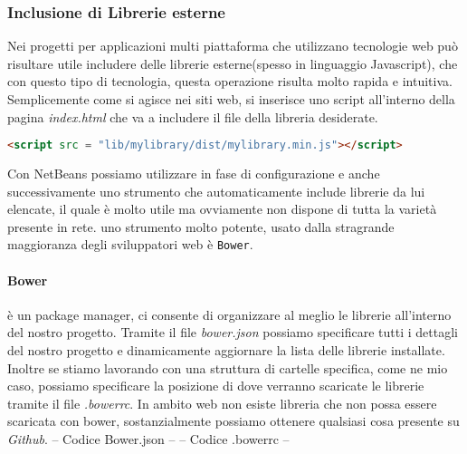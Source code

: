 \subsubsection{Inclusione di Librerie esterne}
Nei progetti per applicazioni multi piattaforma che utilizzano tecnologie web può risultare utile includere delle librerie esterne(spesso in linguaggio Javascript), che con questo tipo di tecnologia, questa operazione risulta molto rapida e intuitiva. \\
Semplicemente come si agisce nei siti web, si inserisce uno script all'interno della pagina \emph{index.html} che va a includere il file della libreria desiderate.
\begin{lstlisting}[language=html]
	<script src = "lib/mylibrary/dist/mylibrary.min.js"></script>
\end{lstlisting}
Con NetBeans possiamo utilizzare in fase di configurazione e anche successivamente uno strumento che automaticamente include librerie da lui elencate, il quale è molto utile ma ovviamente non dispone di tutta la varietà presente in rete. uno strumento molto potente, usato dalla stragrande maggioranza degli sviluppatori web è \texttt{Bower}.
\paragraph{Bower} è un package manager, ci consente di organizzare al meglio le librerie all'interno del nostro progetto. Tramite il file \emph{bower.json} possiamo specificare tutti i dettagli del nostro progetto e dinamicamente aggiornare la lista delle librerie installate. Inoltre se stiamo lavorando con una struttura di cartelle specifica, come ne mio caso, possiamo specificare la posizione di dove verranno scaricate le librerie tramite il file \emph{.bowerrc}. In ambito web non esiste libreria che non possa essere scaricata con bower, sostanzialmente possiamo ottenere qualsiasi cosa presente su \emph{Github}.
-- Codice Bower.json --
-- Codice .bowerrc --
